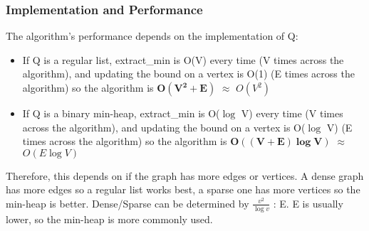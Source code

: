 \subsubsection{Implementation and Performance}
The algorithm's performance depends on the implementation of Q:
\begin{itemize}
    \item If Q is a regular list, extract\_min is O(V) every time (V times across the algorithm), and updating the bound on a vertex is O(1) (E times across the algorithm) so the algorithm is $\boldsymbol{O(V^2 + E)}$ $\approx$ $O(V^2)$
    \item If Q is a binary min-heap, extract\_min is O($\log$ V) every time (V times across the algorithm), and updating the bound on a vertex is O($\log$ V) (E times across the algorithm) so the algorithm is $\boldsymbol{O((V+E)\log V)}$ $\approx$ $O(E \log V)$
\end{itemize}
Therefore, this depends on if the graph has more edges or vertices. A dense graph has more edges so a regular list works best, a sparse one has more vertices so the min-heap is better. Dense/Sparse can be determined by $\frac{v^2}{\log v}$ : E. E is usually lower, so the min-heap is more commonly used.